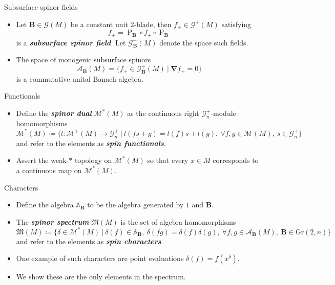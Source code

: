 \documentclass[aspectratio=169]{beamer}
\newcommand\boldgreen[1]{\textcolor{lighter_csu_green}{\emph{\textbf{#1}}}}
\newcommand{\algebra}{\mathcal{A}}
\newcommand{\grad}{\boldsymbol{\nabla}}
\newcommand{\G}{\mathcal{G}}
\newcommand{\characters}{\mathfrak{M}}
\newcommand{\dualmonogenics}{\mathcal{M}^*}
\newcommand{\Grassmannian}[2]{\textrm{Gr}(#1,#2)}
\newcommand{\projection}{\operatorname{P}}
\newcommand{\blade}[1]{\boldsymbol{#1}}
\newcommand{\monogenicfields}[1]{\mathcal{M}^{#1}(M)}
\newcommand{\bivector}{\blade{B}}
\begin{document}
\begin{frame}{Subsurface spinor fields}
\vfill
\begin{itemize}
\pause
\item Let $\bivector \in \G(M)$ be a constant unit $2$-blade, then $f_+\in \G^+(M)$ satisfying
\[
f_+ = \projection_{\bivector} \circ f_+ \circ \projection_{\bivector}
\]
is a \boldgreen{subsurface spinor field}. Let $\G_{\bivector}^+(M)$ denote the space such fields.
\pause
\item The space of monogenic subsurface spinors
\[
\algebra_{\bivector}(M) = \{ f_+ \in \G_{\bivector}^+(M) ~\vert~ \grad f_+ = 0 \}
\]
is a commutative unital Banach algebra.
\end{itemize}
\vfill
\end{frame}

\begin{frame}{Functionals}
\vfill
\begin{itemize}
\pause
\item Define the \boldgreen{spinor dual} $\dualmonogenics(M)$ as the continuous right $\G_n^+$-module homomorphisms
\[
\dualmonogenics(M) \coloneqq \{ l \colon \monogenicfields{+} \to \G_n^+ ~\vert~ l(fs+g)=l(f)s+l(g), ~\forall f,g\in \monogenicfields{}, ~s \in \G_n^+\}
\]
and refer to the elements as \boldgreen{spin functionals}. 
\pause
\item Assert the weak-$\ast$ topology on $\dualmonogenics(M)$ so that every $x\in M$ corresponds to a continuous map on $\dualmonogenics(M)$.
\end{itemize}
\vfill
\end{frame}

\begin{frame}{Characters}
\vfill
\begin{itemize}
\pause
\item Define the algebra $\mathbb{A}_{\bivector}$ to be the algebra generated by $1$ and $\bivector$. 
\pause
\item The \boldgreen{spinor spectrum} $\characters(M)$ is the set of algebra homomorphisms
\[
\characters(M) \coloneqq \{ \delta \in \dualmonogenics(M) ~\vert~ \delta(f)\in\mathbb{A}_{\bivector},~ \delta(fg) = \delta(f)\delta(g),~\forall f,g \in \algebra_{\bivector}(M),~ \bivector \in \Grassmannian{2}{n} \}
\]
and refer to the elements as \boldgreen{spin characters}. 
\pause
\item One example of such characters are point evaluations $\delta(f)=f(x^\delta)$.
\pause
\item We show these are the only elements in the spectrum.
\end{itemize}
\vfill
\end{frame}
\end{document}
